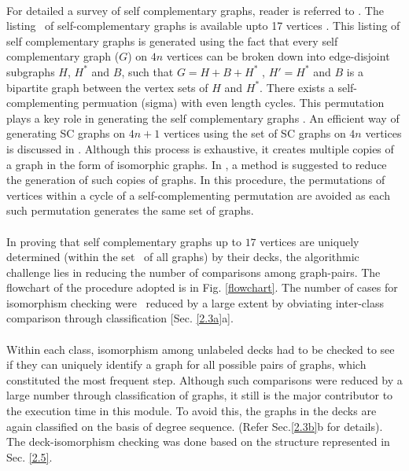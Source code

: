 \documentclass[12pt,conference]{IEEEtran}
\begin{document}
\paragraph*{} For detailed a survey of self complementary graphs, reader is referred to \cite{f2}. The listing  of self-complementary graphs is available upto 17 vertices \cite{b6}. This listing of self complementary graphs is generated using the fact that every self complementary graph ($G$) on $4n$ vertices can be broken down into edge-disjoint subgraphs $H$, $H^*$ and $B$, such that $G = H+B+ H^*$ , $H' = H^{*}$ and $B$ is a bipartite graph between the vertex sets of $H$ and $H^{*}$. There exists a self-complementing permuation (sigma) with even length  cycles. This permutation plays a key role in generating the self complementary graphs \cite{n3}. An efficient way of generating SC graphs on $4n+1$ vertices using the set of SC graphs on $4n$ vertices is discussed in \cite{x1}. Although this process is exhaustive, it creates multiple copies of a graph in the form of isomorphic graphs. In \cite{m3} , a method is suggested to reduce the generation of such copies of graphs. In this procedure, the permutations of vertices within a cycle of a self-complementing permutation are avoided as each such permutation generates the same set of graphs.
\paragraph*{} In proving that self complementary graphs up to $17$ vertices are uniquely determined (within the set  of  all graphs) by their decks, the algorithmic challenge lies in reducing the number of comparisons among graph-pairs. The flowchart of the procedure adopted is in Fig. \ref{flowchart}. The number of cases for isomorphism checking were  reduced by a large extent by obviating inter-class comparison through classification [Sec. \ref{2.3a}a]. 
\paragraph*{} Within each class, isomorphism among unlabeled decks had to be checked to see if they can uniquely identify a graph for all possible pairs of graphs, which constituted the most frequent step. Although such comparisons were reduced by a large number through classification of graphs, it still is the major contributor to the execution time in this module. To avoid this, the graphs in the decks are again classified on the basis of degree sequence. (Refer Sec.\ref{2.3b}b for details). The deck-isomorphism checking was done based on the structure represented in Sec. \ref{2.5}. 
\end{document}
